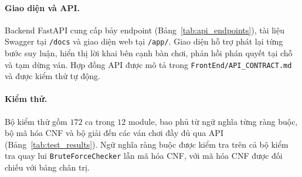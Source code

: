 \paragraph{Giao diện và API.}
Backend FastAPI cung cấp bảy endpoint (Bảng~\ref{tab:api_endpoints}), tài liệu
Swagger tại \nolinkurl{/docs} và giao diện web tại \nolinkurl{/app/}. Giao diện hỗ
trợ phát lại từng bước suy luận, hiển thị lời khai bên cạnh bàn chơi, phản hồi
phán quyết tại chỗ và tạm dừng ván. Hợp đồng API được mô tả trong
\texttt{FrontEnd/API\_CONTRACT.md} và được kiểm thử tự động.

\paragraph{Kiểm thử.}
Bộ kiểm thử gồm $172$ ca trong $12$ module, bao phủ từ ngữ nghĩa từng ràng
buộc, bộ mã hóa CNF và bộ giải đến các ván chơi đầy đủ qua API
(Bảng~\ref{tab:test_results}). Ngữ nghĩa ràng buộc được kiểm tra trên cả bộ
kiểm tra quay lui \texttt{BruteForceChecker} lẫn mã hóa CNF, với mã hóa CNF
được đối chiếu với bảng chân trị.
